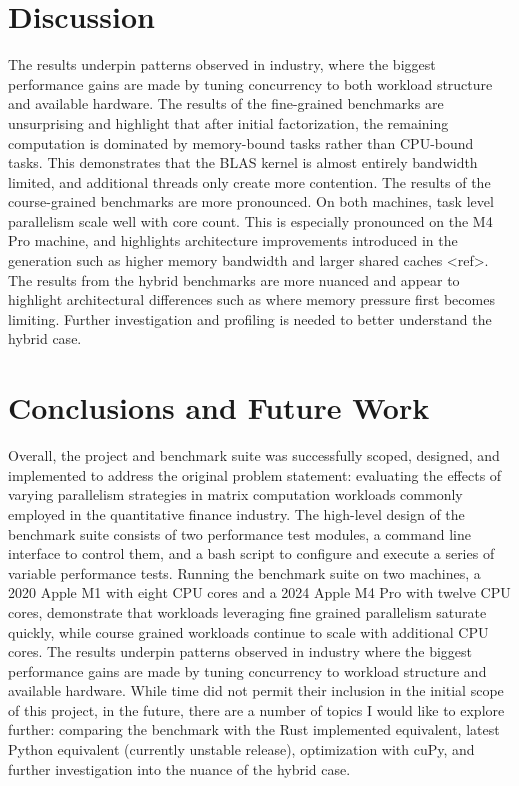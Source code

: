 \documentclass{article}
\begin{document}
\section{Discussion}
\label{sec:headings}
The results underpin patterns observed in industry, where the biggest performance gains are made by tuning concurrency to both workload structure and available hardware. The results of the fine-grained benchmarks are unsurprising and highlight that after initial factorization, the remaining computation is dominated by memory-bound tasks rather than CPU-bound tasks. This demonstrates that the BLAS kernel is almost entirely bandwidth limited, and additional threads only create more contention. The results of the course-grained benchmarks are more pronounced. On both machines, task level parallelism scale well with core count. This is especially pronounced on the M4 Pro machine, and highlights architecture improvements introduced in the generation such as higher memory bandwidth and larger shared caches <ref>. The results from the hybrid benchmarks are more nuanced and appear to highlight architectural differences such as where memory pressure first becomes limiting. Further investigation and profiling is needed to better understand the hybrid case.  


\section{Conclusions and Future Work}
\label{sec:headings}
Overall, the project and benchmark suite was successfully scoped, designed, and implemented to address the original problem statement: evaluating the effects of varying parallelism strategies in matrix computation workloads commonly employed in the quantitative finance industry. The high-level design of the benchmark suite consists of two performance test modules, a command line interface to control them, and a bash script to configure and execute a series of variable performance tests. Running the benchmark suite on two machines, a 2020 Apple M1 with eight CPU cores and a 2024 Apple M4 Pro with twelve CPU cores, demonstrate that workloads leveraging fine grained parallelism saturate quickly, while course grained workloads continue to scale with additional CPU cores. The results underpin patterns observed in industry where the biggest performance gains are made by tuning concurrency to workload structure and available hardware. While time did not permit their inclusion in the initial scope of this project, in the future, there are a number of topics I would like to explore further: comparing the benchmark with the Rust implemented equivalent, latest Python equivalent (currently unstable release), optimization with cuPy, and further investigation into the nuance of the hybrid case. 


 
\end{document}
